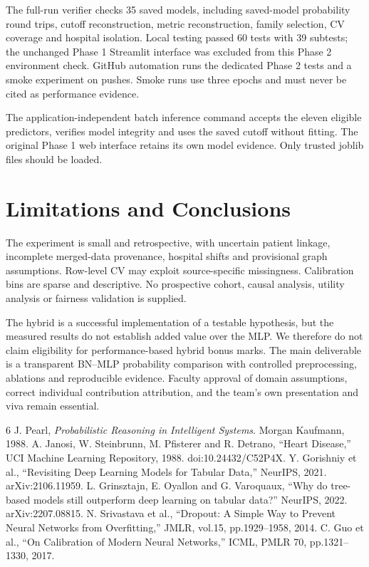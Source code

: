 \documentclass[conference]{IEEEtran}
\begin{document}
The full-run verifier checks 35 saved models, including saved-model probability round trips, cutoff reconstruction, metric reconstruction, family selection, CV coverage and hospital isolation. Local testing passed 60 tests with 39 subtests; the unchanged Phase 1 Streamlit interface was excluded from this Phase 2 environment check. GitHub automation runs the dedicated Phase 2 tests and a smoke experiment on pushes. Smoke runs use three epochs and must never be cited as performance evidence.

The application-independent batch inference command accepts the eleven eligible predictors, verifies model integrity and uses the saved cutoff without fitting. The original Phase 1 web interface retains its own model evidence. Only trusted joblib files should be loaded.
\section{Limitations and Conclusions}
The experiment is small and retrospective, with uncertain patient linkage, incomplete merged-data provenance, hospital shifts and provisional graph assumptions. Row-level CV may exploit source-specific missingness. Calibration bins are sparse and descriptive. No prospective cohort, causal analysis, utility analysis or fairness validation is supplied.

The hybrid is a successful implementation of a testable hypothesis, but the measured results do not establish added value over the MLP. We therefore do not claim eligibility for performance-based hybrid bonus marks. The main deliverable is a transparent BN--MLP probability comparison with controlled preprocessing, ablations and reproducible evidence. Faculty approval of domain assumptions, correct individual contribution attribution, and the team's own presentation and viva remain essential.
\begin{thebibliography}{6}
 J. Pearl, \emph{Probabilistic Reasoning in Intelligent Systems}. Morgan Kaufmann, 1988.
 A. Janosi, W. Steinbrunn, M. Pfisterer and R. Detrano, ``Heart Disease,'' UCI Machine Learning Repository, 1988. doi:10.24432/C52P4X.
 Y. Gorishniy et al., ``Revisiting Deep Learning Models for Tabular Data,'' NeurIPS, 2021. arXiv:2106.11959.
 L. Grinsztajn, E. Oyallon and G. Varoquaux, ``Why do tree-based models still outperform deep learning on tabular data?'' NeurIPS, 2022. arXiv:2207.08815.
 N. Srivastava et al., ``Dropout: A Simple Way to Prevent Neural Networks from Overfitting,'' JMLR, vol.15, pp.1929--1958, 2014.
 C. Guo et al., ``On Calibration of Modern Neural Networks,'' ICML, PMLR 70, pp.1321--1330, 2017.
\end{thebibliography}
\end{document}
